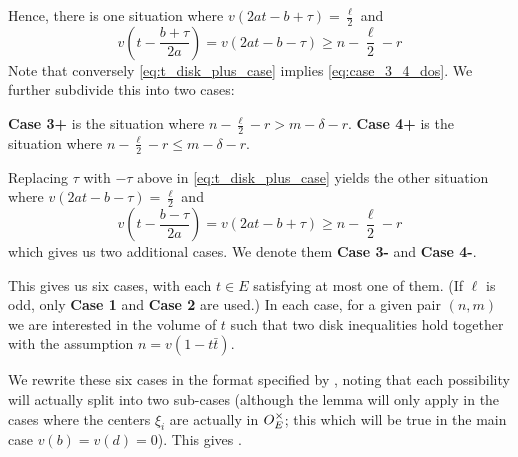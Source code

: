 \begin{itemize}
  Hence, there is one situation where $v(2at-b+\tau) = \frac{\ell}{2}$ and
  \begin{equation}
    v\left( t - \frac{b+\tau}{2a} \right) = v(2at-b-\tau) \ge n - \frac{\ell}{2} - r
    \label{eq:t_disk_plus_case}
  \end{equation}
  Note that conversely \eqref{eq:t_disk_plus_case} implies \eqref{eq:case_3_4_dos}.
  We further subdivide this into two cases:
  \begin{itemize}
    \ii \textbf{Case 3\ts+} is the situation where $n - \frac{\ell}{2} - r > m - \delta - r$.
    \ii \textbf{Case 4\ts+} is the situation where $n - \frac{\ell}{2} - r \le m - \delta - r$.
  \end{itemize}
  Replacing $\tau$ with $-\tau$ above in \eqref{eq:t_disk_plus_case} yields
  the other situation where $v(2at-b-\tau) = \frac{\ell}{2}$ and
  \begin{equation}
    v\left( t - \frac{b-\tau}{2a} \right) = v(2at-b+\tau) \ge n - \frac{\ell}{2} - r
    \label{eq:t_disk_minus_case}
  \end{equation}
  which gives us two additional cases.
  We denote them \textbf{Case 3\ts-} and \textbf{Case 4\ts-}.
\end{itemize}

This gives us six cases, with each $t \in E$ satisfying at most one of them.
(If $\ell$ is odd, only \textbf{Case 1} and \textbf{Case 2} are used.)
In each case, for a given pair $(n,m)$ we are interested in the volume of $t$
such that two disk inequalities hold together with the assumption $n = v(1-t \bar t)$.

We rewrite these six cases in the format specified by ,
noting that each possibility will actually split into two sub-cases
(although the lemma will only apply in the cases where the centers
$\xi_i$ are actually in $O_E^\times$;
this which will be true in the main case $v(b) = v(d) = 0$).
This gives .

